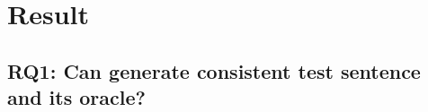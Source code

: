 \section{Result}
\label{sec:result}

\subsection{RQ1: Can \tool generate consistent test sentence and
  its oracle?}


